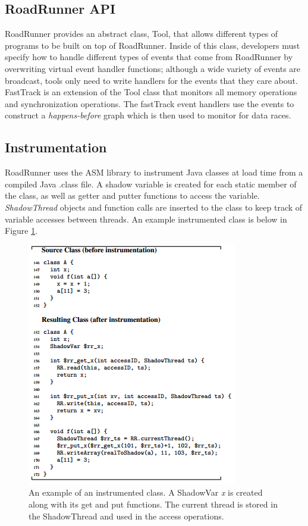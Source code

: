 \documentclass{acm_proc_article-sp}
\begin{document}
\subsection{RoadRunner API}
RoadRunner provides an abstract class, Tool, that allows different types of programs to be built on top of RoadRunner. Inside of this class, developers must specify how to handle different types of events that come from RoadRunner by overwriting virtual event handler functions; although a wide variety of events are broadcast, tools only need to write handlers for the events that they care about. FastTrack is an extension of the Tool class that monitors all memory operations and synchronization operations. The fastTrack event handlers use the events to construct a \emph{happens-before} graph which is then used to monitor for data races.


\subsection{Instrumentation}
RoadRunner uses the ASM \cite{Bruneton02} library to instrument Java classes at load time from a compiled Java .class file. A shadow variable is created for each static member of the class, as well as getter and putter functions to access the variable. \emph{ShadowThread} objects and function calls are inserted to the class to keep track of variable accesses between threads. An example instrumented class is below in Figure \ref{instrumentation}.
  \begin{figure}[h]
    \centering
    \begin{minipage} [h] {7.5cm}
      \includegraphics[scale=.9]{instrumentatin}
      \caption{An example of an instrumented class. A ShadowVar \emph{x} is created along with its get and put functions. The current thread is stored in the ShadowThread and used in the access operations.\label{instrumentation}}
    \end{minipage}
  \end{figure}
\end{document}
